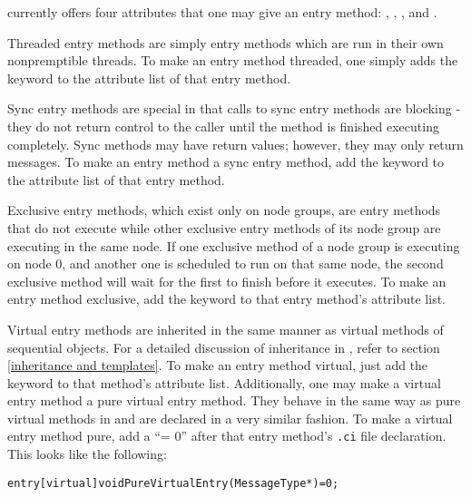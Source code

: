 \charmpp{} currently offers four attributes that one may give an entry method:
, , , and .

Threaded entry methods are simply entry
methods which are run in their own nonpremptible threads.  To make an
entry method threaded, one simply adds the keyword
 to the attribute list of that entry method.

Sync entry methods are special in that calls to
sync entry methods are blocking - they do not return control to the caller
until the method is finished executing completely.  Sync methods may have
return values; however, they may only return messages.  To make an entry method a sync entry method, add the keyword  to the
attribute list of that entry method.

Exclusive entry methods, which exist only on node groups, are
entry methods that do not execute while other exclusive
entry methods of its node group are executing in the same
node.  If one exclusive method of a node group is executing on node 0, and
another one is scheduled to run on that same node, the second exclusive method
will wait for the first to finish before it executes.  To make an entry method exclusive, add the keyword  to that
entry method's attribute list.

Virtual entry methods are inherited in the
same manner as virtual methods of sequential \CC{} objects.  For a detailed
discussion of inheritance in \charmpp{}, refer to section \ref{inheritance and
templates}.  To make an entry method virtual, just add the keyword 
to that method's attribute list.  Additionally, one may make a virtual
entry method a pure virtual entry method.  They behave in
the same way as pure virtual methods in \CC{} and are declared in a very
similar fashion.  To make a virtual entry method pure, add a ``= 0'' after that
entry method's {\tt .ci} file declaration.  This looks like the following:

\begin{alltt}
entry [virtual] void PureVirtualEntry(MessageType *) = 0;
\end{alltt}
